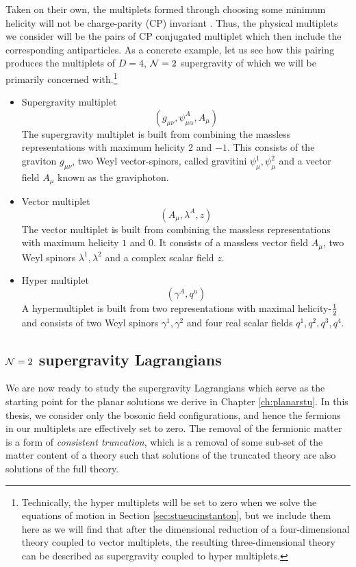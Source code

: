 Taken on their own, the multiplets formed through choosing some minimum helicity will not be charge-parity (CP) invariant \cite{Mohaupt:2000gc}. Thus, the physical multiplets we consider will be the pairs of CP conjugated multiplet which then include the corresponding antiparticles. As a concrete example, let us see how this pairing produces the multiplets of $D = 4$, ${\cal N} = 2$ supergravity of which we will be primarily concerned with.\footnote{Technically, the hyper multiplets will be set to zero when we solve the equations of motion in Section \ref{sec:stueucinstanton}, but we include them here as we will find that after the dimensional reduction of a four-dimensional theory coupled to vector multiplets, the resulting three-dimensional theory can be described as supergravity coupled to hyper multiplets.}

\begin{itemize}
	\item Supergravity multiplet 
	\begin{equation*}
		(g_{\mu \nu}, \psi_{\mu \alpha}^A, A_\mu)
	\end{equation*}
	The supergravity multiplet is built from combining the massless representations with maximum helicity $2$ and $-1$. This consists of the graviton $g_{\mu \nu}$, two Weyl vector-spinors, called gravitini $\psi^1_\mu, \psi^2_\mu$ and a vector field $A_\mu$ known as the graviphoton. 
	
	\item Vector multiplet
	\begin{equation*}
		(A_\mu, \lambda^A, z)
	\end{equation*}
	The vector multiplet is built from combining the massless representations with maximum helicity $1$ and $0$. It consists of a massless vector field $A_\mu$, two Weyl spinors $\lambda^1, \lambda^2$ and a complex scalar field $z$.  
	
	\item Hyper multiplet 
	\begin{equation*}
		(\gamma^A, q^u)
	\end{equation*}
	A hypermultiplet is built from two representations with maximal helicity-$\frac{1}{2}$ and consists of two Weyl spinors $\gamma^1, \gamma^2$ and four real scalar fields $q^1,q^2,q^3,q^4$.
\end{itemize}


\subsection{${\cal N} = 2$ supergravity Lagrangians}
\label{sec:supergravitylag}
We are now ready to study the supergravity Lagrangians which serve as the starting point for the planar solutions we derive in Chapter \ref{ch:planarstu}. In this thesis, we consider only the bosonic field configurations, and hence the fermions in our multiplets are effectively set to zero. The removal of the fermionic matter is a form of \emph{consistent truncation}, which is a removal of some sub-set of the matter content of a theory such that solutions of the truncated theory are also solutions of the full theory. 

